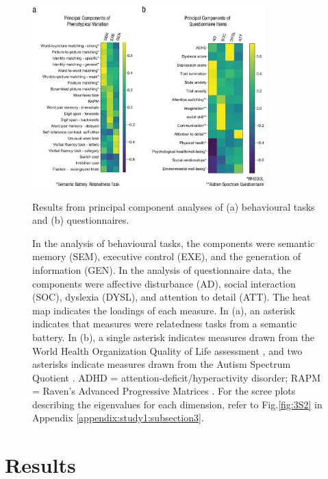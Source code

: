 \begin{figure}[p]
	\centering
	\includegraphics[width=0.8\textwidth]{chapters/img/study1fig3.jpeg}
	\caption{Results from principal component analyses of (a) behavioural tasks and (b) questionnaires.} 
	\caption*{In the analysis of behavioural tasks, the components were semantic memory (SEM), executive control (EXE), and the generation of information (GEN). In the analysis of questionnaire data, the components were affective disturbance (AD), social interaction (SOC), dyslexia (DYSL), and attention to detail (ATT). The heat map indicates the loadings of each measure. In (a), an asterisk indicates that measures were relatedness tasks from a semantic battery. In (b), a single asterisk indicates measures drawn from the World Health Organization Quality of Life assessment \cite{WHOQOL2002}, and two asterisks indicate measures drawn from the Autism Spectrum Quotient \cite{Baron-Cohen2001}. ADHD = attention-deficit/hyperactivity disorder; RAPM = Raven’s Advanced Progressive Matrices \cite{Raven1998}. For the scree plots describing the eigenvalues for each dimension, refer to Fig.\ref{fig:3S2} in Appendix \ref{appendix:study1:subsection3}.}
	\label{fig:study1:fig3}
\end{figure}

\section{Results}
\label{study1:results}

